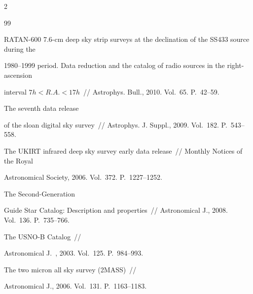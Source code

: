 \begin{multicols}{2}
{{\begin{thebibliography}{99}


RATAN-600 7.6-cm deep sky strip surveys at the declination of the SS433 source during the 

1980--1999  period. Data reduction and the catalog of radio sources in the right-ascension 

interval  $7h < R.A. < 17h$~// Astrophys. Bull., 2010. Vol.~65. P.~42--59.


 The seventh data release 

of the sloan digital sky survey~// Astrophys. J. Suppl., 2009. Vol.~182. P.~543--558.



The UKIRT infrared deep sky survey early data release~// Monthly Notices of the Royal 

Astronomical Society, 2006. Vol.~372. P.~1227--1252.



The Second-Generation 

Guide Star Catalog: Description and properties~// Astronomical J., 2008. Vol.~136. P.~735--766.



The USNO-B Catalog~// 

Astronomical J.~, 2003. Vol.~125. P.~984--993.


 The two micron all sky survey (2MASS)~// 

Astronomical J., 2006. Vol.~131. P.~1163--1183. 


\end{thebibliography}}}
\end{multicols}

